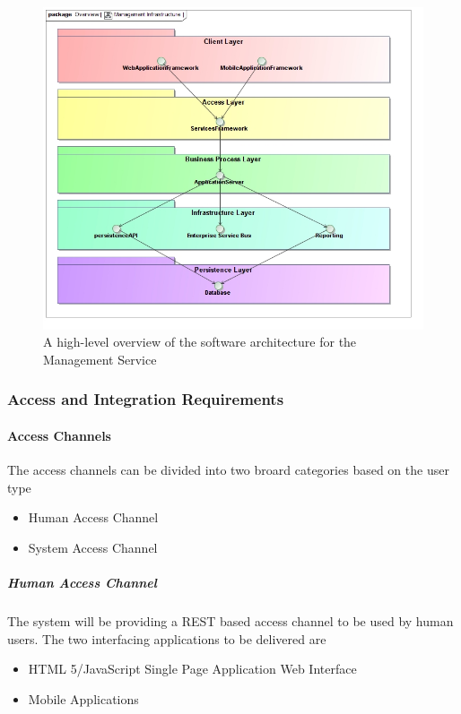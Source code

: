\begin{figure}[H]
  \begin{center}
  \includegraphics[scale=0.4]{../Diagrams and Charts/Overview/ManagementInfrastructure.jpg}
  \caption{A high-level overview of the software architecture for the Management Service}
  \label{fig:managementInfrastructure}
  \end{center}
\end{figure}


\subsubsection{Access and Integration Requirements}
\paragraph{Access Channels}
The access channels can be divided into two broard categories based on the user type
\begin{itemize}
	\item Human Access Channel
	\item System Access Channel
\end{itemize}

\subparagraph{Human Access Channel}
The system will be providing a REST based access channel to be used by human
users. The two interfacing applications to be delivered are
\begin{itemize}
	\item HTML 5/JavaScript Single Page Application Web Interface
	\item Mobile Applications
\end{itemize}

